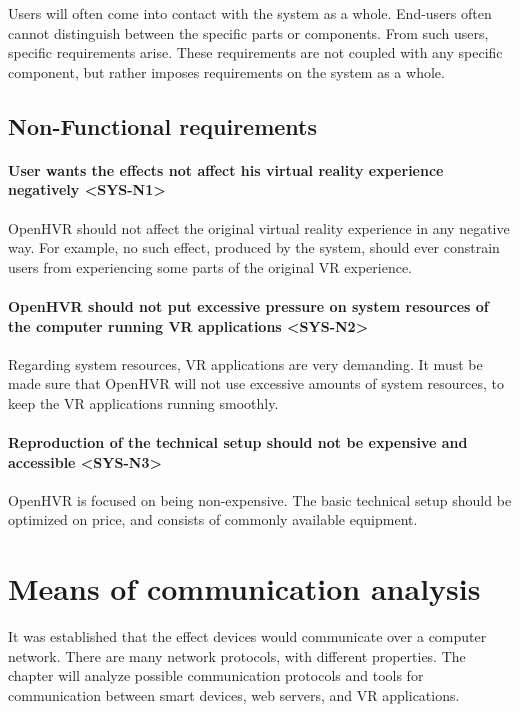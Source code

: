 Users will often come into contact with the system as a whole. End-users
often cannot distinguish between the specific parts or components. From such
users, specific requirements arise. These requirements are not coupled with
any specific component, but rather imposes requirements on the system as a whole.


\subsection{Non-Functional requirements}

\paragraph*{User wants the effects not affect his virtual reality experience negatively <SYS-N1>}
\label{sys-n1}
OpenHVR should not affect the original virtual reality experience in any
negative way. For example, no such effect, produced by the system, should ever
constrain users from experiencing some parts of the original VR experience.

\paragraph*{OpenHVR should not put excessive pressure on system resources of the computer running VR applications <SYS-N2>}
\label{sys-n2}
Regarding system resources, VR applications are very demanding. It must be
made sure that OpenHVR will not use excessive amounts of system resources,
to keep the VR applications running smoothly.

\paragraph*{Reproduction of the technical setup should not be expensive and accessible <SYS-N3>}
\label{sys-n3}
OpenHVR is focused on being non-expensive. The basic technical setup should be
optimized on price, and consists of commonly available equipment.


\section{Means of communication analysis}

It was established that the effect devices would communicate over a computer network.
There are many network protocols, with different properties. The chapter will
analyze possible communication protocols and tools for communication
between smart devices, web servers, and VR applications.



